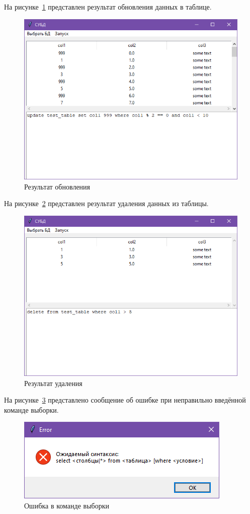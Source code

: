 На рисунке~\ref{fig:update_sql} представлен результат обновления данных в таблице.
\begin{figure}[H]
	\centering
	\includegraphics[width=0.9\linewidth]{"images/обновление"}
	\caption{Результат обновления}
	\label{fig:update_sql}
\end{figure}

На рисунке~\ref{fig:delete_sql} представлен результат удаления данных из таблицы.
\begin{figure}[H]
	\centering
	\includegraphics[width=0.9\linewidth]{"images/удаление"}
	\caption{Результат удаления}
	\label{fig:delete_sql}
\end{figure}

На рисунке~\ref{fig:error} представлено сообщение об ошибке при неправильно введённой команде выборки.
\begin{figure}[H]
	\centering
	\includegraphics[width=0.7\linewidth]{"images/ошибка"}
	\caption{Ошибка в команде выборки}
	\label{fig:error}
\end{figure}

